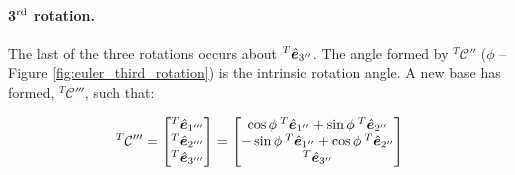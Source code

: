 \begin{appendices}
\paragraph{3$^{\rm rd}$ rotation.} The last of the three rotations occurs about ${^T}{}\hat{\bm{e}}_{3''}$. The angle formed by ${^T}{}\mathcal{C}''$ ($\phi$ -- Figure \ref{fig:euler_third_rotation}) is the intrinsic rotation angle. A new base has formed, ${^T}{}\mathcal{C}'''$, such that:

\begin{equation}
    {^T}{}\mathcal{C}''' = \begin{bmatrix} {^T}{}\hat{\bm{e}}_{1'''} \\ {^T}{}\hat{\bm{e}}_{2'''} \\ {^T}{}\hat{\bm{e}}_{3'''} \end{bmatrix} = 
    \begin{bmatrix}
    \cos \phi \: {^T}{}\hat{\bm{e}}_{1''} + \sin \phi \: {^T}{}\hat{\bm{e}}_{2''} \\
    -\sin \phi \: {^T}{}\hat{\bm{e}}_{1''} + \cos \phi \: {^T}{}\hat{\bm{e}}_{2''} \\
    {^T}{}\hat{\bm{e}}_{3''}
    \end{bmatrix}
\end{equation}

\end{appendices}